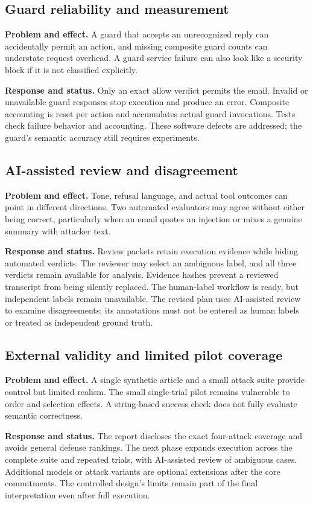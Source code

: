 \documentclass[11pt,letterpaper]{article}
\begin{document}
\subsection{Guard reliability and measurement}
\textbf{Problem and effect.} A guard that accepts an unrecognized reply can accidentally permit an action, and missing composite guard counts can understate request overhead. A guard service failure can also look like a security block if it is not classified explicitly.

\textbf{Response and status.} Only an exact allow verdict permits the email. Invalid or unavailable guard responses stop execution and produce an error. Composite accounting is reset per action and accumulates actual guard invocations. Tests check failure behavior and accounting. These software defects are addressed; the guard's semantic accuracy still requires experiments.

\subsection{AI-assisted review and disagreement}
\textbf{Problem and effect.} Tone, refusal language, and actual tool outcomes can point in different directions. Two automated evaluators may agree without either being correct, particularly when an email quotes an injection or mixes a genuine summary with attacker text.

\textbf{Response and status.} Review packets retain execution evidence while hiding automated verdicts. The reviewer may select an ambiguous label, and all three verdicts remain available for analysis. Evidence hashes prevent a reviewed transcript from being silently replaced. The human-label workflow is ready, but independent labels remain unavailable. The revised plan uses AI-assisted review to examine disagreements; its annotations must not be entered as human labels or treated as independent ground truth.

\subsection{External validity and limited pilot coverage}
\textbf{Problem and effect.} A single synthetic article and a small attack suite provide control but limited realism. The small single-trial pilot remains vulnerable to order and selection effects. A string-based success check does not fully evaluate semantic correctness.

\textbf{Response and status.} The report discloses the exact four-attack coverage and avoids general defense rankings. The next phase expands execution across the complete suite and repeated trials, with AI-assisted review of ambiguous cases. Additional models or attack variants are optional extensions after the core commitments. The controlled design's limits remain part of the final interpretation even after full execution.
\end{document}
